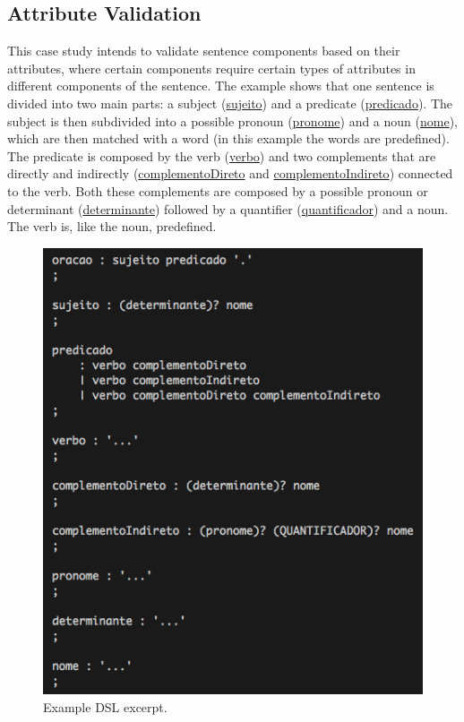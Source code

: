 \subsection{Attribute Validation}
This case study intends to validate sentence components based on their attributes, where certain components require certain types of attributes in different components of the sentence. The example shows that one sentence is divided into two main parts: a subject (\underline{sujeito}) and a predicate (\underline{predicado}). The subject is then subdivided into a possible pronoun (\underline{pronome}) and a noun (\underline{nome}), which are then matched with a word (in this example the words are predefined). The predicate is composed by the verb (\underline{verbo}) and two complements that are directly and indirectly (\underline{complementoDireto} and \underline{complementoIndireto}) connected to the verb. Both these complements are composed by a possible pronoun or determinant (\underline{determinante}) followed by a quantifier (\underline{quantificador}) and a noun. The verb is, like the noun, predefined.

\begin{figure}[h]
    \centering
    \includegraphics[width=12cm]{images/dsl_excerpt.png}
    \caption{Example DSL excerpt.}
    \label{fig:dsl_excerpt}
\end{figure}


